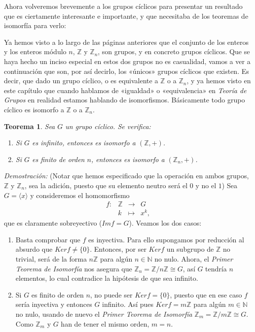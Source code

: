 \documentclass[12pt]{article}
\newtheorem{theorem}{Teorema}[section]
\begin{document}
Ahora volveremos brevemente a los grupos cíclicos para presentar un resultado que es ciertamente interesante e importante, y que necesitaba de los teoremas de isomorfía para verlo:

Ya hemos visto a lo largo de las páginas anteriores que el conjunto de los enteros y los enteros módulo $n$, $\mathbb{Z}$ y $\mathbb{Z}_{n}$, son grupos, y en concreto grupos cíclicos. Que se haya hecho un inciso especial en estos dos grupos no es casualidad, vamos a ver a continuación que son, por así decirlo, los «únicos» grupos cíclicos que existen. Es decir, que dado un grupo cíclico, o es equivalente a $\mathbb{Z}$ o a $\mathbb{Z}_{n}$, y ya hemos visto en este capítulo que cuando hablamos de «igualdad» o «equivalencia» en \textit{Teoría de Grupos} en realidad estamos hablando de isomorfismos. Básicamente todo grupo cíclico es isomorfo a $\mathbb{Z}$ o a $\mathbb{Z}_{n}$.

\begin{theorem}
Sea $G$ un grupo cíclico. Se verifica:
\begin{enumerate}
\item Si $G$ es infinito, entonces es isomorfo a $(\mathbb{Z},+)$.
\item Si $G$ es finito de orden $n$, entonces es isomorfo a $(\mathbb{Z}_{n},+)$.
\end{enumerate}
\end{theorem}
\emph{Demostración: }(Notar que hemos especificado que la operación en ambos grupos, $\mathbb{Z}$ y $\mathbb{Z}_{n}$, sea la adición, puesto que su elemento neutro será el $0$ y no el $1$)
Sea $G = \langle x \rangle$ y consideremos el homomorfismo $$\begin{array}{rccl}
f\colon &\mathbb{Z}& \longrightarrow &G\\
&k& \longmapsto &x^{k},
\end{array}
$$ que es claramente sobreyectivo ($Im f = G$). Veamos los dos casos: 

\begin{enumerate}
\item Basta comprobar que $f$ es inyectiva. Para ello supongamos por reducción al absurdo que $Ker f \neq \lbrace 0\rbrace$. Entonces, por ser $Ker f$ un subgrupo de $\mathbb{Z}$ no trivial, será de la forma $n\mathbb{Z}$ para algún $n \in \mathbb{N}$ no nulo. Ahora, el \textit{Primer Teorema de Isomorfía} nos asegura que $\mathbb{Z}_{n} = \mathbb{Z}/n\mathbb{Z} \cong G$, así $G$ tendría $n$ elementos, lo cual contradice la hipótesis de que sea infinito.
\item Si $G$ es finito de orden $n$, no puede ser $Ker f = \lbrace 0 \rbrace$, puesto que en ese caso $f$ sería  inyectiva y entonces $G$ infinito. Así pues $Ker f = m\mathbb{Z}$ para algún $m \in \mathbb{N}$ no nulo, usando de nuevo el \textit{Primer Teorema de Isomorfía} $\mathbb{Z}_{m} = \mathbb{Z}/m\mathbb{Z} \cong G$. Como $\mathbb{Z}_{m}$ y $G$ han de tener el mismo orden, $m=n$.
\end{enumerate}
\end{document}
